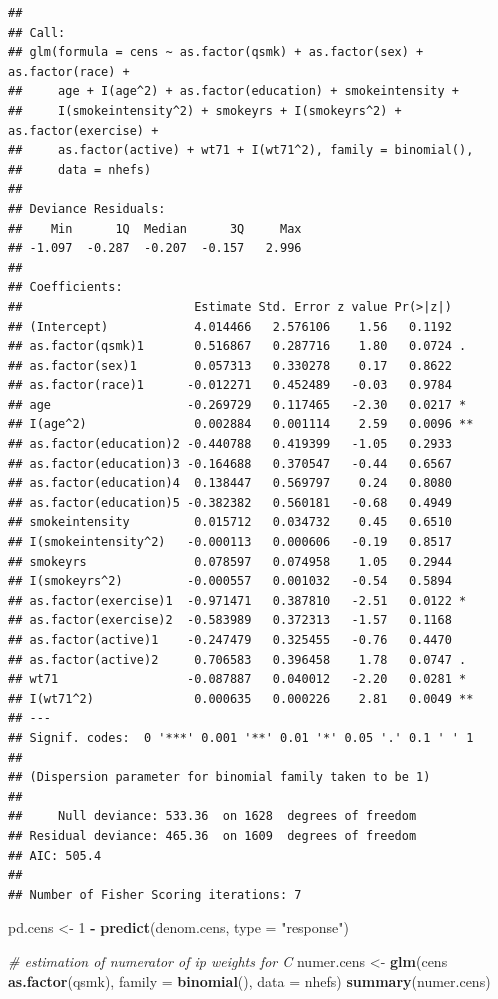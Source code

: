 \documentclass[
  10pt,
]{book}
\newenvironment{Shaded}{\begin{snugshade}}{\end{snugshade}}
\newcommand{\CommentTok}[1]{\textcolor[rgb]{0.56,0.35,0.01}{\textit{#1}}}
\newcommand{\DataTypeTok}[1]{\textcolor[rgb]{0.13,0.29,0.53}{#1}}
\newcommand{\DecValTok}[1]{\textcolor[rgb]{0.00,0.00,0.81}{#1}}
\newcommand{\KeywordTok}[1]{\textcolor[rgb]{0.13,0.29,0.53}{\textbf{#1}}}
\newcommand{\NormalTok}[1]{#1}
\newcommand{\OperatorTok}[1]{\textcolor[rgb]{0.81,0.36,0.00}{\textbf{#1}}}
\newcommand{\StringTok}[1]{\textcolor[rgb]{0.31,0.60,0.02}{#1}}
\begin{document}
\begin{verbatim}
## 
## Call:
## glm(formula = cens ~ as.factor(qsmk) + as.factor(sex) + as.factor(race) + 
##     age + I(age^2) + as.factor(education) + smokeintensity + 
##     I(smokeintensity^2) + smokeyrs + I(smokeyrs^2) + as.factor(exercise) + 
##     as.factor(active) + wt71 + I(wt71^2), family = binomial(), 
##     data = nhefs)
## 
## Deviance Residuals: 
##    Min      1Q  Median      3Q     Max  
## -1.097  -0.287  -0.207  -0.157   2.996  
## 
## Coefficients:
##                        Estimate Std. Error z value Pr(>|z|)   
## (Intercept)            4.014466   2.576106    1.56   0.1192   
## as.factor(qsmk)1       0.516867   0.287716    1.80   0.0724 . 
## as.factor(sex)1        0.057313   0.330278    0.17   0.8622   
## as.factor(race)1      -0.012271   0.452489   -0.03   0.9784   
## age                   -0.269729   0.117465   -2.30   0.0217 * 
## I(age^2)               0.002884   0.001114    2.59   0.0096 **
## as.factor(education)2 -0.440788   0.419399   -1.05   0.2933   
## as.factor(education)3 -0.164688   0.370547   -0.44   0.6567   
## as.factor(education)4  0.138447   0.569797    0.24   0.8080   
## as.factor(education)5 -0.382382   0.560181   -0.68   0.4949   
## smokeintensity         0.015712   0.034732    0.45   0.6510   
## I(smokeintensity^2)   -0.000113   0.000606   -0.19   0.8517   
## smokeyrs               0.078597   0.074958    1.05   0.2944   
## I(smokeyrs^2)         -0.000557   0.001032   -0.54   0.5894   
## as.factor(exercise)1  -0.971471   0.387810   -2.51   0.0122 * 
## as.factor(exercise)2  -0.583989   0.372313   -1.57   0.1168   
## as.factor(active)1    -0.247479   0.325455   -0.76   0.4470   
## as.factor(active)2     0.706583   0.396458    1.78   0.0747 . 
## wt71                  -0.087887   0.040012   -2.20   0.0281 * 
## I(wt71^2)              0.000635   0.000226    2.81   0.0049 **
## ---
## Signif. codes:  0 '***' 0.001 '**' 0.01 '*' 0.05 '.' 0.1 ' ' 1
## 
## (Dispersion parameter for binomial family taken to be 1)
## 
##     Null deviance: 533.36  on 1628  degrees of freedom
## Residual deviance: 465.36  on 1609  degrees of freedom
## AIC: 505.4
## 
## Number of Fisher Scoring iterations: 7
\end{verbatim}

\begin{Shaded}
\begin{Highlighting}[]
\NormalTok{pd.cens <-}\StringTok{ }\DecValTok{1} \OperatorTok{-}\StringTok{ }\KeywordTok{predict}\NormalTok{(denom.cens, }\DataTypeTok{type =} \StringTok{"response"}\NormalTok{)}

\CommentTok{# estimation of numerator of ip weights for C}
\NormalTok{numer.cens <-}
\StringTok{  }\KeywordTok{glm}\NormalTok{(cens }\OperatorTok{~}\StringTok{ }\KeywordTok{as.factor}\NormalTok{(qsmk), }\DataTypeTok{family =} \KeywordTok{binomial}\NormalTok{(), }\DataTypeTok{data =}\NormalTok{ nhefs)}
\KeywordTok{summary}\NormalTok{(numer.cens)}
\end{Highlighting}
\end{Shaded}
\end{document}
